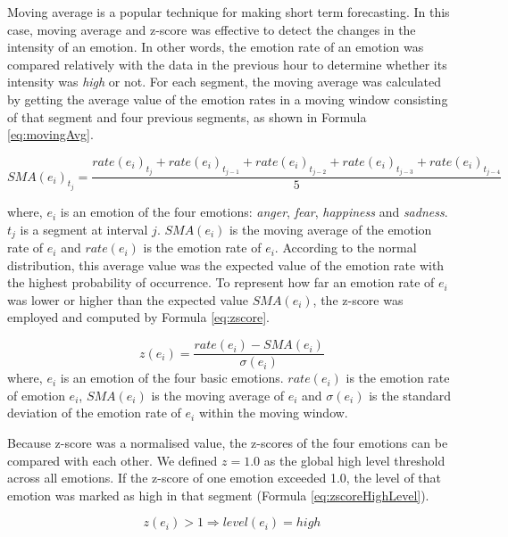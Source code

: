 Moving average is a popular technique for making short term forecasting. In this case, moving average and z-score was effective to detect the changes in the intensity of an emotion. In other words, the emotion rate of an emotion was compared relatively with the data in the previous hour to determine whether its intensity was \textit{high} or not. For each segment, the moving average was calculated by getting the average value of the emotion rates in a moving window consisting of that segment and four previous segments, as shown in Formula \ref{eq:movingAvg}.

\begin{equation}
\label{eq:movingAvg}
	SMA(e_i)_{t_j} = \frac{ rate(e_i)_{t_j} + rate(e_i)_{t_{j-1}} + rate(e_i)_{t_{j-2}} + rate(e_i)_{t_{j-3}} + rate(e_i)_{t_{j-4}} }{5}
\end{equation} 

where, \(e_i\) is an emotion of the four emotions: \textit{anger}, \textit{fear}, \textit{happiness} and \textit{sadness}. \(t_j\) is a segment at interval \(j\). \(SMA(e_i)\) is the moving average of the emotion rate of \(e_i\) and \(rate(e_i)\) is the emotion rate of \(e_i\). According to the normal distribution, this average value was the expected value of the emotion rate with the highest probability of occurrence. To represent how far an emotion rate of \(e_i\) was lower or higher than the expected value \(SMA(e_i)\), the z-score was employed and computed by Formula \ref{eq:zscore}.

\begin{equation}
\label{eq:zscore}
	z(e_i) = \frac{rate(e_i) - SMA(e_i)}{\sigma(e_i)}
\end{equation}
where, \(e_i\) is an emotion of the four basic emotions. \(rate(e_i)\) is the emotion rate of emotion \(e_i\), \(SMA(e_i)\) is the moving average of \(e_i\) and \(\sigma(e_i)\) is the standard deviation of the emotion rate of \(e_i\) within the moving window. 

Because z-score was a normalised value, the z-scores of the four emotions can be compared with each other. We defined \(z = 1.0\) as the global high level threshold across all emotions. If the z-score of one emotion exceeded 1.0, the level of that emotion was marked as high in that segment (Formula \ref{eq:zscoreHighLevel}).

\begin{equation}
\label{eq:zscoreHighLevel}
	z(e_i) > 1 \Rightarrow level(e_i) = high
\end{equation} 

